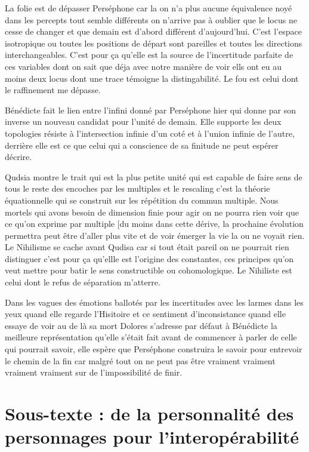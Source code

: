 \documentclass{article}
\begin{document}
 
 
 La folie est de dépasser Perséphone car la on n'a plus aucune équivalence noyé dans les percepts tout semble différents on n'arrive pas à oublier que le locus ne cesse de changer et que demain est d'abord différent d'aujourd'hui. C'est l'espace isotropique ou toutes les positions de départ sont pareilles et toutes les directions interchangeables. C'est pour  ça qu'elle est la source de l'incertitude parfaite de ces variables dont on sait que déja  avec notre manière de voir ells ont eu au moins deux locus dont une trace témoigne la distingabilité. Le fou est celui dont le raffinement me dépasse.
 
 Bénédicte fait le lien entre  l'infini donné par Perséphone hier qui donne par son inverse un nouveau candidat pour l'unité de demain. Elle supporte les deux topologies résiste à l'intersection infinie d'un coté et à l'union infinie de l'autre, derrière elle est ce que  celui qui a conscience de sa finitude ne peut espérer décrire. 
 
 Qudsia montre le trait qui est la plus petite unité qui est capable de faire sens de tous le reste des encoches  par les multiples et le rescaling c'est la théorie équationnelle qui se construit sur les répétition du commun multiple. Nous mortels qui avons besoin de dimension finie pour agir on ne pourra rien voir que ce qu'on exprime par multiple [du moins dans cette dérive, la prochaine évolution permettra peut être d'aller plus vite et de voir émerger la vie la ou ne voyait rien. Le Nihilisme se cache  avant Qudisa car si tout était pareil on ne pourrait rien distinguer c'est pour ça qu'ellle est l'origine des constantes, ces principes qu'on veut mettre pour batir le sens constructible ou cohomologique. Le Nihiliste est celui dont le refus de séparation m'atterre.
 
 Dans les vagues des émotions ballotés par les incertitudes avec les larmes dans les yeux quand elle regarde l'Hisitoire et ce sentiment d'inconsistance quand elle essaye de voir au de là sa mort Dolores s'adresse par défaut à Bénédicte la meilleure représentation qu'elle s'était fait avant de commencer à parler de celle qui pourrait savoir, elle espère que Perséphone construira le savoir pour entrevoir le chemin de la fin car malgré tout on ne peut pas être vraiment vraiment vraiment vraiment sur de l'impossibilité de finir. 

\section{Sous-texte : de la personnalité des personnages pour l'interopérabilité}
\end{document}
